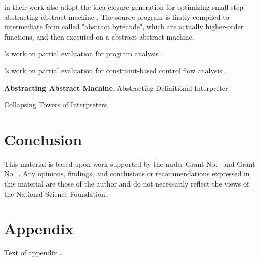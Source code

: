 \documentclass[acmsmall,review,anonymous]{acmart}\settopmatter{printfolios=true,printccs=false,printacmref=false}
\begin{document}
\citeauthor{Johnson:2013:OAA:2500365.2500604} in their work also adopt the 
idea closure generation for optimizing small-step abstracting abstract machine
\cite{Johnson:2013:OAA:2500365.2500604}. The source program is firstly compiled
to intermediate form called "abstract bytecode", which are actually higher-order functions, 
and then executed on a abstract abstract machine.

\citeauthor{damian1999partial}'s work on partial evaluation for program analysis \cite{damian1999partial}.

\citeauthor{amtoft1999partial}'s work on partial evaluation for constraint-based 
control flow analysis \cite{amtoft1999partial}.

\textbf{Abstracting Abstract Machine}. Abstracting Definitional Interpreter \cite{darais2017abstracting}

Collapsing Towers of Interpreters\cite{Amin:2017:CTI:3177123.3158140}

\section{Conclusion}

\begin{acks}                            %
  This material is based upon work supported by the
   under Grant
  No.~ and Grant
  No.~.  Any opinions, findings, and
  conclusions or recommendations expressed in this material are those
  of the author and do not necessarily reflect the views of the
  National Science Foundation.
\end{acks}



\appendix
\section{Appendix}

Text of appendix \ldots
\end{document}
